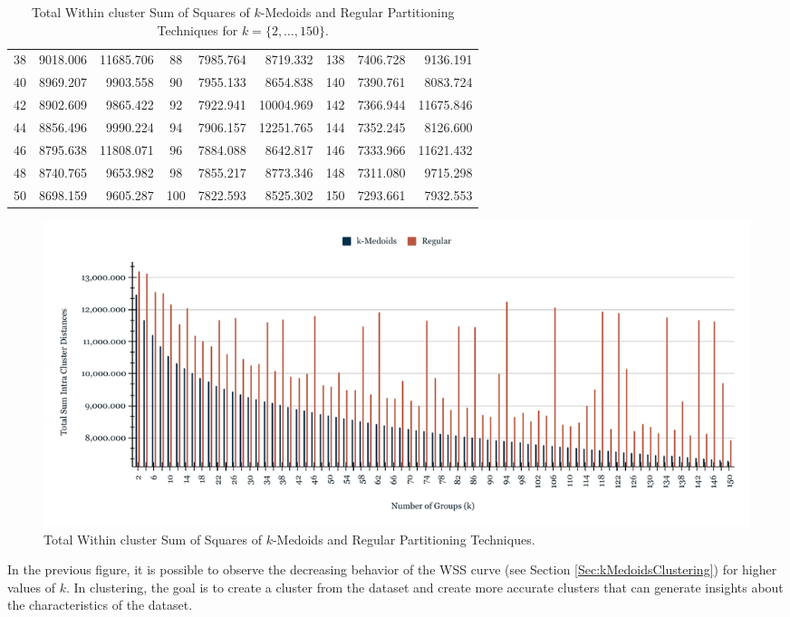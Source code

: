 \begin{table}[h]
\begin{tabular}{|c|r|r|c|r|r|c|r|r|}
		38 &  9018.006 & 11685.706 &  88 & 7985.764 &  8719.332 & 138 & 7406.728 &  9136.191 \\
		40 &  8969.207 &  9903.558 &  90 & 7955.133 &  8654.838 & 140 & 7390.761 &  8083.724 \\
		42 &  8902.609 &  9865.422 &  92 & 7922.941 & 10004.969 & 142 & 7366.944 & 11675.846 \\
		44 &  8856.496 &  9990.224 &  94 & 7906.157 & 12251.765 & 144 & 7352.245 &  8126.600 \\
		46 &  8795.638 & 11808.071 &  96 & 7884.088 &  8642.817 & 146 & 7333.966 & 11621.432 \\
		48 &  8740.765 &  9653.982 &  98 & 7855.217 &  8773.346 & 148 & 7311.080 &  9715.298 \\
		50 &  8698.159 &  9605.287 & 100 & 7822.593 &  8525.302 & 150 & 7293.661 &  7932.553 \\ \hline
		
	\end{tabular}
	\caption{Total Within cluster Sum of Squares of $k$-Medoids and Regular Partitioning Techniques for $k = \{2, \ldots, 150\}$.}
	\label{Table:TotalSumRegularkMedoids}
\end{table}


\begin{figure}[h]
	\centering
	\includegraphics[scale=0.46]{../Figures/Scaled-TotalSum-RegularKmedoids}
	\caption{Total Within cluster Sum of Squares of $k$-Medoids and Regular Partitioning Techniques.}
	\label{Fig:TotalSum-RegularKmedoids}
\end{figure}

In the previous figure, it is possible to observe the decreasing behavior of the WSS curve (see Section \ref{Sec:kMedoidsClustering}) for higher values of $k$. In clustering, the goal is to create a cluster from the dataset and create more accurate clusters that can generate insights about the characteristics of the dataset.

